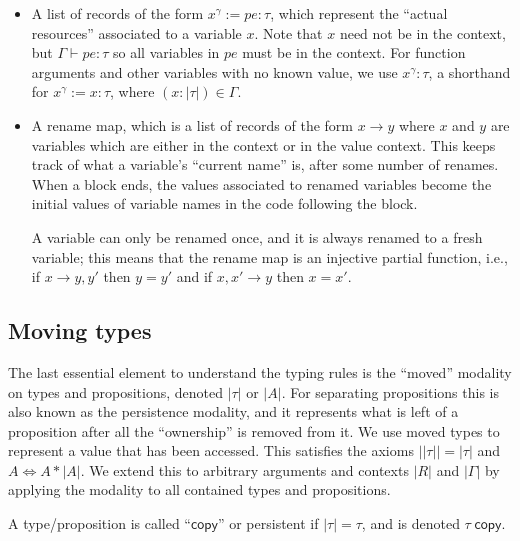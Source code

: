 \documentclass[acmsmall,nonacm]{acmart}
\newcommand{\core}[1]{\left| #1 \right|}
\newcommand{\proves}{\vdash}
\begin{document}
\begin{itemize}
\item A list of records of the form $x^\gamma:=pe:\tau$, which represent the ``actual resources'' associated to a variable $x$. Note that $x$ need not be in the context, but $\Gamma\proves pe:\tau$ so all variables in $pe$ must be in the context. For function arguments and other variables with no known value, we use $x^\gamma:\tau$, a shorthand for $x^\gamma:=x:\tau$, where $(x:\core\tau)\in\Gamma$.
\item A rename map, which is a list of records of the form $x\to y$ where $x$ and $y$ are variables which are either in the context or in the value context. This keeps track of what a variable's ``current name'' is, after some number of renames. When a block ends, the values associated to renamed variables become the initial values of variable names in the code following the block.

A variable can only be renamed once, and it is always renamed to a fresh variable; this means that the rename map is an injective partial function, i.e., if $x\to y,y'$ then $y=y'$ and if $x,x'\to y$ then $x=x'$.
\end{itemize}

\subsection{Moving types}\label{sec:moving}

The last essential element to understand the typing rules is the ``moved'' modality on types and propositions, denoted $\core\tau$ or $\core A$. For separating propositions this is also known as the persistence modality, and it represents what is left of a proposition after all the ``ownership'' is removed from it. We use moved types to represent a value that has been accessed. This satisfies the axioms $\core{\core\tau}=\core\tau$ and $A\Leftrightarrow A\ast\core A$. We extend this to arbitrary arguments and contexts $\core R$ and $\core\Gamma$ by applying the modality to all contained types and propositions.

A type/proposition is called ``$\mathsf{copy}$'' or persistent if $\core\tau=\tau$, and is denoted $\tau\;\mathsf{copy}$.
\end{document}
